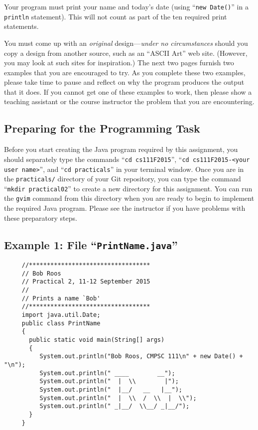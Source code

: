 Your program must print your name and today's date (using ``{\tt new Date()}'' in a {\tt println} statement).  This will
not count as part of the ten required print statements.

You must come up with an {\em original} design---{\em under no circumstances} should you copy a design from another
source, such as an ``ASCII Art'' web site. (However, you may look at such sites for inspiration.) The next two pages
furnish two examples that you are encouraged to try. As you complete these two examples, please take time to pause and
reflect on why the program produces the output that it does.  If you cannot get one of these examples to work, then
please show a teaching assistant or the course instructor the problem that you are encountering.

\subsection*{Preparing for the Programming Task}

Before you start creating the Java program required by this assignment, you should separately type the commands ``{\tt cd
  cs111F2015}'', ``{\tt cd cs111F2015-<your user name>}'', and ``{\tt cd practicals}'' in your terminal window. Once you
are in the {\tt practicals/} directory of your Git repository, you can type the command ``{\tt mkdir practical02}'' to
create a new directory for this assignment. You can run the {\tt gvim} command from this directory when you are ready to
begin to implement the required Java program. Please see the instructor if you have problems with these preparatory steps.


\subsection*{Example 1: File ``{\tt PrintName.java}''}
\begin{verbatim}
     //**********************************
     // Bob Roos
     // Practical 2, 11-12 September 2015
     //
     // Prints a name `Bob'
     //**********************************
     import java.util.Date;
     public class PrintName
     {
       public static void main(String[] args)
       {
          System.out.println("Bob Roos, CMPSC 111\n" + new Date() + "\n");
          System.out.println(" ____        __");
          System.out.println("  |  \\        |");
          System.out.println("  |__/   __   |__");
          System.out.println("  |  \\  /  \\  |  \\");
          System.out.println(" _|__/  \\__/ _|__/");
       }
     }
\end{verbatim}

